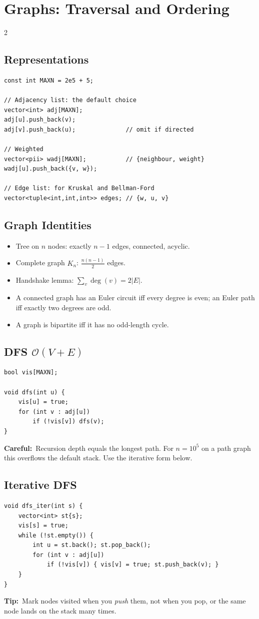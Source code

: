 \documentclass[10pt]{article}
\newcommand{\sub}[2]{\subsection[#1]{#1\hspace{0.6em}%
  \textnormal{\color{accent2}\small$\mathcal{O}(#2)$}}}
\newcommand{\tip}[1]{{\color{tipc}\footnotesize\textbf{Tip:}}~{\footnotesize #1}\par}
\newcommand{\warn}[1]{{\color{warnc}\footnotesize\textbf{Careful:}}~{\footnotesize #1}\par}
\begin{document}
\section{Graphs: Traversal and Ordering}
\begin{multicols}{2}

\subsection{Representations}
\begin{lstlisting}
const int MAXN = 2e5 + 5;

// Adjacency list: the default choice
vector<int> adj[MAXN];
adj[u].push_back(v);
adj[v].push_back(u);              // omit if directed

// Weighted
vector<pii> wadj[MAXN];           // {neighbour, weight}
wadj[u].push_back({v, w});

// Edge list: for Kruskal and Bellman-Ford
vector<tuple<int,int,int>> edges; // {w, u, v}
\end{lstlisting}

\subsection{Graph Identities}
\begin{itemize}
    \item Tree on $n$ nodes: exactly $n - 1$ edges, connected, acyclic.
    \item Complete graph $K_n$: $\frac{n(n-1)}{2}$ edges.
    \item Handshake lemma: $\sum_{v} \deg(v) = 2|E|$.
    \item A connected graph has an Euler circuit iff every degree is
          even; an Euler path iff exactly two degrees are odd.
    \item A graph is bipartite iff it has no odd-length cycle.
\end{itemize}

\sub{DFS}{V + E}
\begin{lstlisting}
bool vis[MAXN];

void dfs(int u) {
    vis[u] = true;
    for (int v : adj[u])
        if (!vis[v]) dfs(v);
}
\end{lstlisting}
\warn{Recursion depth equals the longest path. For $n = 10^5$ on a path
graph this overflows the default stack. Use the iterative form below.}

\subsection{Iterative DFS}
\begin{lstlisting}
void dfs_iter(int s) {
    vector<int> st{s};
    vis[s] = true;
    while (!st.empty()) {
        int u = st.back(); st.pop_back();
        for (int v : adj[u])
            if (!vis[v]) { vis[v] = true; st.push_back(v); }
    }
}
\end{lstlisting}
\tip{Mark nodes visited when you \emph{push} them, not when you pop, or
the same node lands on the stack many times.}


\end{multicols}
\end{document}
